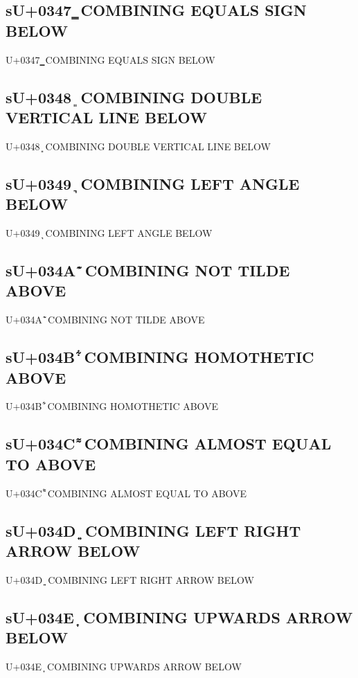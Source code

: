 \subsection{sU+0347 ͇ COMBINING EQUALS SIGN BELOW}

U+0347 ͇ COMBINING EQUALS SIGN BELOW

\subsection{sU+0348 ͈ COMBINING DOUBLE VERTICAL LINE BELOW}

U+0348 ͈ COMBINING DOUBLE VERTICAL LINE BELOW

\subsection{sU+0349 ͉ COMBINING LEFT ANGLE BELOW}

U+0349 ͉ COMBINING LEFT ANGLE BELOW

\subsection{sU+034A ͊ COMBINING NOT TILDE ABOVE}

U+034A ͊ COMBINING NOT TILDE ABOVE

\subsection{sU+034B ͋ COMBINING HOMOTHETIC ABOVE}

U+034B ͋ COMBINING HOMOTHETIC ABOVE

\subsection{sU+034C ͌ COMBINING ALMOST EQUAL TO ABOVE}

U+034C ͌ COMBINING ALMOST EQUAL TO ABOVE

\subsection{sU+034D ͍ COMBINING LEFT RIGHT ARROW BELOW}

U+034D ͍ COMBINING LEFT RIGHT ARROW BELOW

\subsection{sU+034E ͎ COMBINING UPWARDS ARROW BELOW}

U+034E ͎ COMBINING UPWARDS ARROW BELOW

